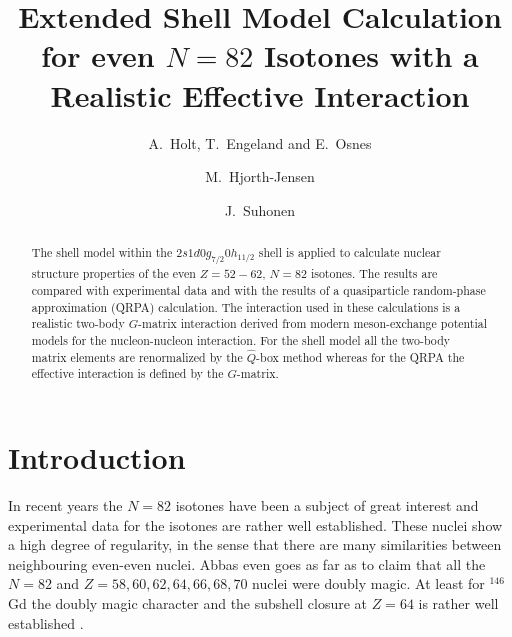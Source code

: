 



\begin{frontmatter}

\title{Extended Shell Model Calculation for even $N=82$ Isotones with a 
Realistic Effective Interaction}

\author{A.\ Holt, T.\ Engeland and E.\ Osnes}

\address{Department of Physics, University of Oslo, N-0316 Oslo, Norway}

\author{M.\ Hjorth-Jensen}

\address{Nordita, Blegdamsvej 17, DK-2100 K\o benhavn \O, Denmark}

\author{J.\ Suhonen}

\address{Department of Physics, University of Jyv\"{a}skyl\"{a},
              P.O.Box 35, FIN-40351 Jyv\"{a}skyl\"{a}, Finland}

\maketitle

\begin{abstract}
The shell model within the $2s1d0g_{7/2}0h_{11/2}$ shell is applied to 
calculate nuclear structure properties of the even $Z=52 - 62$, $N=82$ 
isotones. The results are compared with experimental data and with the 
results of a quasiparticle random-phase approximation (QRPA) calculation.
The interaction used in these calculations is a realistic 
two-body $G$-matrix
interaction derived from modern meson-exchange potential models for the
nucleon-nucleon interaction. 
For the shell model all the 
two-body matrix elements are renormalized by the $\hat{Q}$-box method 
whereas for the QRPA the effective interaction is defined 
by the $G$-matrix.
\end{abstract}

\end{frontmatter}

\section{Introduction}

In recent years the $N=82$ isotones have been a subject of great interest and 
experimental data for the isotones are rather well established.  These nuclei 
show a high degree of regularity, in the sense that there are many 
similarities between neighbouring even-even nuclei. Abbas \cite{a84} even 
goes as far as to claim that all the $N=82$ and $Z=58, 60, 62, 64, 66, 68, 70$
nuclei were doubly magic. At least for $^{146}$Gd the doubly magic character 
and the subshell closure at $Z=64$ is rather well established 
\cite{wsg89,yjk86}.

